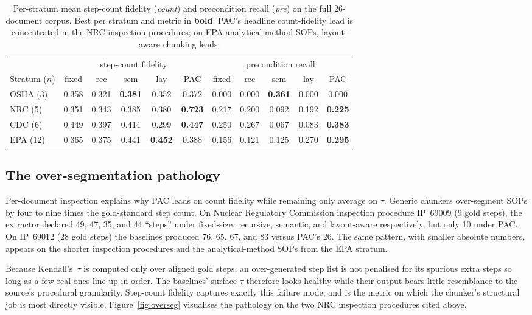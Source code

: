 \documentclass[fleqn,10pt]{wlscirep}
\begin{document}
\begin{table}[ht]
\centering
\caption{Per-stratum mean step-count fidelity (\emph{count}) and
precondition recall (\emph{pre}) on the full 26-document corpus. Best
per stratum and metric in \textbf{bold}. PAC's headline count-fidelity
lead is concentrated in the NRC inspection procedures; on EPA
analytical-method SOPs, layout-aware chunking leads.}
\label{tab:perstratum}
\begin{tabular}{lcccccccccc}
\toprule
& \multicolumn{5}{c}{step-count fidelity}
& \multicolumn{5}{c}{precondition recall} \\
\cmidrule(lr){2-6}\cmidrule(lr){7-11}
Stratum ($n$) & fixed & rec & sem & lay & PAC
              & fixed & rec & sem & lay & PAC \\
\midrule
OSHA (3)
  & 0.358 & 0.321 & \textbf{0.381} & 0.352 & 0.372
  & 0.000 & 0.000 & \textbf{0.361} & 0.000 & 0.000 \\
NRC (5)
  & 0.351 & 0.343 & 0.385 & 0.380 & \textbf{0.723}
  & 0.217 & 0.200 & 0.092 & 0.192 & \textbf{0.225} \\
CDC (6)
  & 0.449 & 0.397 & 0.414 & 0.299 & \textbf{0.447}
  & 0.250 & 0.267 & 0.067 & 0.083 & \textbf{0.383} \\
EPA (12)
  & 0.365 & 0.375 & 0.441 & \textbf{0.452} & 0.388
  & 0.156 & 0.121 & 0.125 & 0.270 & \textbf{0.295} \\
\bottomrule
\end{tabular}
\end{table}

\subsection*{The over-segmentation pathology}

Per-document inspection explains why PAC leads on count fidelity while
remaining only average on $\tau$. Generic chunkers over-segment SOPs by
four to nine times the gold-standard step count. On Nuclear Regulatory
Commission inspection procedure IP~69009 (9 gold steps), the extractor
declared 49, 47, 35, and 44 ``steps'' under fixed-size, recursive,
semantic, and layout-aware respectively, but only 10 under PAC. On
IP~69012 (28 gold steps) the baselines produced 76, 65, 67, and 83
versus PAC's 26. The same pattern, with smaller absolute numbers,
appears on the shorter inspection procedures and the analytical-method
SOPs from the EPA stratum.

Because Kendall's~$\tau$ is computed only over aligned gold steps, an
over-generated step list is not penalised for its spurious extra steps
so long as a few real ones line up in order. The baselines' surface
$\tau$ therefore looks healthy while their output bears little
resemblance to the source's procedural granularity. Step-count fidelity
captures exactly this failure mode, and is the metric on which the
chunker's structural job is most directly visible.
Figure~\ref{fig:overseg} visualises the pathology on the two NRC
inspection procedures cited above.
\end{document}

